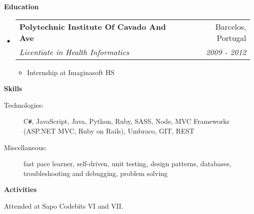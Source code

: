 \documentclass[letterpaper,11pt]{article}
\makeatletter
\newcommand{\resitem}[1]{\item #1 \vspace{-2pt}}
\newcommand{\resheading}[1]{{\large \colorbox{mygrey}{\begin{minipage}{\textwidth}{\textbf{#1 \vphantom{p\^{E}}}}\end{minipage}}}}
\newcommand{\ressubheading}[4]{
\begin{tabular*}{7.0in}{l@{\extracolsep{\fill}}r}
		\textbf{#1} & #2 \\
		\textit{#3} & \textit{#4} \\
\end{tabular*}\vspace{-6pt}}
\makeatother
\begin{document}
\resheading{Education}
\begin{itemize}
	\item
	\ressubheading{Polytechnic Institute Of C\´avado And Ave}{Barcelos, Portugal}{Licentiate in Health Informatics}{2009 - 2012}
	\begin{itemize}
		\resitem{Internship at Imaginasoft HS}
	\end{itemize}
	
\end{itemize}


\resheading{Skills}

\begin{description}
\item[Technologies:]
C{}\verb!#!, JavaScript, Java, Python, Ruby, SASS, Node, MVC Frameworks (ASP.NET MVC, Ruby on Rails), Umbraco, GIT, REST
\item[Miscellaneous:]
fast pace learner, self-driven, unit testing, design patterns, databases, troubleshooting and debugging, problem solving
\end{description}	

\resheading{Activities}

\begin{description}
\item[Attended at Sapo Codebits VI and VII.]
\end{description}
\end{document}
